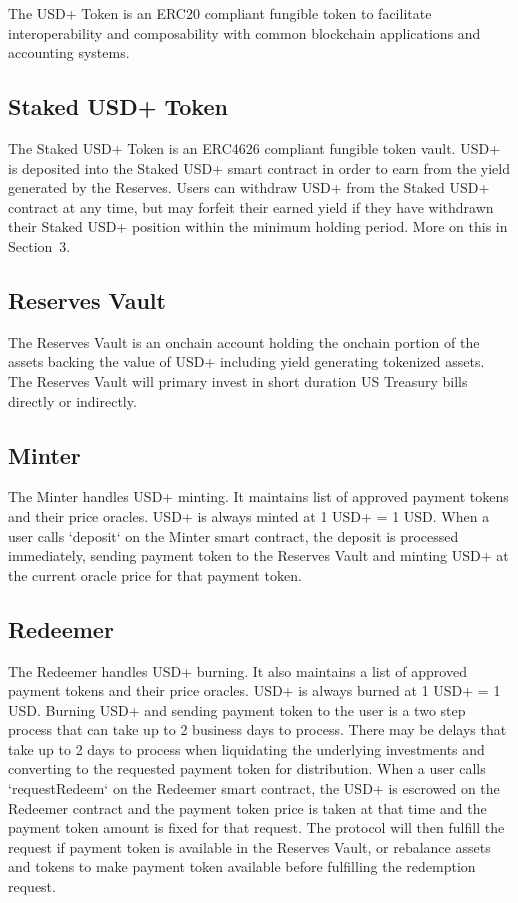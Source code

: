 \documentclass[sigconf,nonacm,prologue,table]{acmart}
\begin{document}
The USD+ Token is an ERC20 compliant fungible token to facilitate interoperability and composability with common blockchain applications and accounting systems.

\subsection{Staked USD+ Token}

The Staked USD+ Token is an ERC4626 compliant fungible token vault. USD+ is deposited into the Staked USD+ smart contract in order to earn from the yield generated by the Reserves. Users can withdraw USD+ from the Staked USD+ contract at any time, but may forfeit their earned yield if they have withdrawn their Staked USD+ position within the minimum holding period. More on this in Section~3.

\subsection{Reserves Vault}

The Reserves Vault is an onchain account holding the onchain portion of the assets backing the value of USD+ including yield generating tokenized assets. The Reserves Vault will primary invest in short duration US Treasury bills directly or indirectly.

\subsection{Minter}

The Minter handles USD+ minting. It maintains list of approved payment tokens and their price oracles. USD+ is always minted at 1 USD+ = 1 USD. When a user calls `deposit` on the Minter smart contract, the deposit is processed immediately, sending payment token to the Reserves Vault and minting USD+ at the current oracle price for that payment token.

\subsection{Redeemer}

The Redeemer handles USD+ burning. It also maintains a list of approved payment tokens and their price oracles. USD+ is always burned at 1 USD+ = 1 USD. Burning USD+ and sending payment token to the user is a two step process that can take up to 2 business days to process. There may be delays that take up to 2 days to process when liquidating the underlying investments and converting to the requested payment token for distribution. When a user calls `requestRedeem` on the Redeemer smart contract, the USD+ is escrowed on the Redeemer contract and the payment token price is taken at that time and the payment token amount is fixed for that request. The protocol will then fulfill the request if payment token is available in the Reserves Vault, or rebalance assets and tokens to make payment token available before fulfilling the redemption request.
\end{document}
